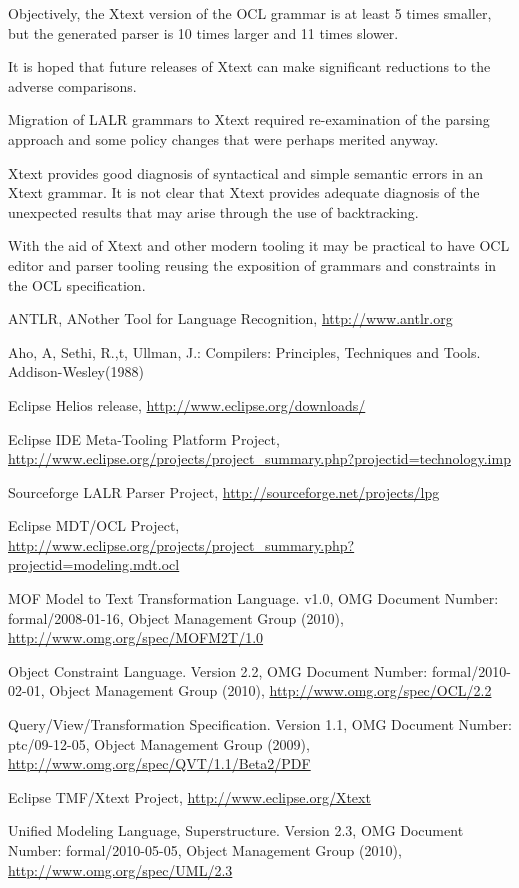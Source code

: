 \documentclass[runningheads,a4paper]{llncs}
\begin{document}
Objectively, the Xtext version of the OCL grammar is at least 5 times smaller, but the generated parser is 10 times larger and 11 times slower.

It is hoped that future releases of Xtext can make significant reductions to the adverse comparisons.

Migration of LALR grammars to Xtext required re-examination of the parsing approach and some policy changes that were perhaps merited anyway.

Xtext provides good diagnosis of syntactical and simple semantic errors in an Xtext grammar. It is not clear that Xtext provides adequate diagnosis of the unexpected results that may arise through the use of backtracking.

With the aid of Xtext and other modern tooling it may be practical to have OCL editor and parser tooling reusing the exposition of grammars and constraints in the OCL specification.


\begin{thebibliography}{4}

 ANTLR, ANother Tool for Language Recognition,  \url{http://www.antlr.org}

 Aho, A, Sethi, R.,t, Ullman, J.: Compilers: Principles, Techniques and Tools. Addison-Wesley(1988) 

 Eclipse Helios release,  \url{http://www.eclipse.org/downloads/}

 Eclipse IDE Meta-Tooling Platform Project,  \url{http://www.eclipse.org/projects/project_summary.php?projectid=technology.imp}

 Sourceforge LALR Parser Project,  \url{http://sourceforge.net/projects/lpg}

 Eclipse MDT/OCL Project,  \url{http://www.eclipse.org/projects/project_summary.php?projectid=modeling.mdt.ocl}

 MOF Model to Text Transformation Language. v1.0, OMG Document Number: formal/2008-01-16, Object Management Group (2010),  \url{http://www.omg.org/spec/MOFM2T/1.0}

 Object Constraint Language. Version 2.2, OMG Document Number: formal/2010-02-01, Object Management Group (2010),  \url{http://www.omg.org/spec/OCL/2.2}

 Query/View/Transformation Specification. Version 1.1, OMG Document Number: ptc/09-12-05, Object Management Group (2009),  \url{http://www.omg.org/spec/QVT/1.1/Beta2/PDF}

 Eclipse TMF/Xtext Project,  \url{http://www.eclipse.org/Xtext}

 Unified Modeling Language, Superstructure. Version 2.3, OMG Document Number: formal/2010-05-05, Object Management Group (2010),  \url{http://www.omg.org/spec/UML/2.3}

\end{thebibliography}
\end{document}
